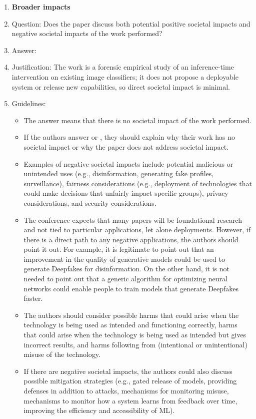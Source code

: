\documentclass{article}
\begin{document}
\begin{enumerate}
\item {\bf Broader impacts}
    \item[] Question: Does the paper discuss both potential positive societal impacts and negative societal impacts of the work performed?
    \item[] Answer: \answerNA{}
    \item[] Justification: The work is a forensic empirical study of an inference-time intervention on existing image classifiers; it does not propose a deployable system or release new capabilities, so direct societal impact is minimal.
    \item[] Guidelines:
    \begin{itemize}
        \item The answer \answerNA{} means that there is no societal impact of the work performed.
        \item If the authors answer \answerNA{} or \answerNo, they should explain why their work has no societal impact or why the paper does not address societal impact.
        \item Examples of negative societal impacts include potential malicious or unintended uses (e.g., disinformation, generating fake profiles, surveillance), fairness considerations (e.g., deployment of technologies that could make decisions that unfairly impact specific groups), privacy considerations, and security considerations.
        \item The conference expects that many papers will be foundational research and not tied to particular applications, let alone deployments. However, if there is a direct path to any negative applications, the authors should point it out. For example, it is legitimate to point out that an improvement in the quality of generative models could be used to generate Deepfakes for disinformation. On the other hand, it is not needed to point out that a generic algorithm for optimizing neural networks could enable people to train models that generate Deepfakes faster.
        \item The authors should consider possible harms that could arise when the technology is being used as intended and functioning correctly, harms that could arise when the technology is being used as intended but gives incorrect results, and harms following from (intentional or unintentional) misuse of the technology.
        \item If there are negative societal impacts, the authors could also discuss possible mitigation strategies (e.g., gated release of models, providing defenses in addition to attacks, mechanisms for monitoring misuse, mechanisms to monitor how a system learns from feedback over time, improving the efficiency and accessibility of ML).
    \end{itemize}


\end{enumerate}
\end{document}
